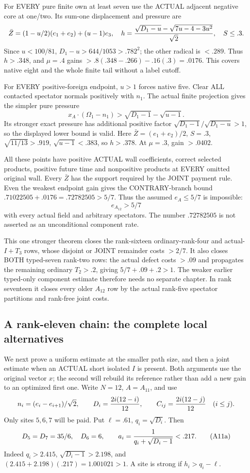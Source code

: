 For EVERY pure finite own at least seven use
the ACTUAL adjacent negative core at one/two.
Its sum-one displacement and pressure are
\[
 \bar Z=(1-u/2)(e_1+e_2)+(u-1)e_3,\quad
 h={\sqrt{D_1-u}-\sqrt{7u-4-3u^2}\over\sqrt2},
 \quad S\le.3 .
\]
Since \(u<100/81\),
\(D_1-u>644/1053>.782^2\);
the other radical is \(<.289\).
Thus \(h>.348\), and \(\mu=.4\) gains
\(>.8(.348-.266)-.16(.3)=.0176\).
This covers native eight and the whole finite
tail without a label cutoff.

For EVERY positive-foreign endpoint, \(u>1\)
forces native five.
Clear ALL contacted spectator normals positively
with \(n_1\).
The actual finite projection gives the simpler
pure pressure
\[
 x_A\cdot(\Omega_1-n_1)>
                  \sqrt{D_1-1}-\sqrt{u-1}.
\]
Its stronger exact pressure has additional
positive factor
\(\sqrt{D_1-1}/\sqrt{D_1-u}>1\), so the
displayed lower bound is valid.
Here \(\bar Z=(e_1+e_2)/2\), \(S=.3\),
\(\sqrt{11/13}>.919\), \(\sqrt{u-1}<.383\),
so \(h>.378\).
At \(\mu=.3\), gain \(>.0402\).

All these points have positive ACTUAL wall
coefficients, correct selected products, positive
future time and nonpositive products at EVERY
omitted original wall.
Every \(\bar Z\) has the support required
by the JOINT payment rule.
Even the weakest endpoint gain gives the
CONTRARY-branch bound
\(.71022505+.0176=.72782505>5/7\).
Thus the assumed \(e_A\le5/7\) is impossible:
\[
                                  e_{A_{12}}>5/7
\tag{A12U}\label{eq:arithA12universal}
\]
with every actual field and arbitrary spectators.
The number \(.72782505\) is not asserted
as an unconditional component rate.

This one stronger theorem closes the rank-sixteen
ordinary-rank-four and actual-\(I+T_3\) rows,
whose disjoint or JOINT remainder costs \(>2/7\).
It also closes BOTH typed-seven rank-two rows:
the actual defect costs \(>.09\) and propagates
the remaining ordinary \(T_2>.2\), giving
\(5/7+.09+.2>1\).
The weaker earlier typed-only component estimate
therefore needs no separate chapter.
In rank seventeen it closes every older
\(A_{12}\) row by the actual rank-five spectator
partitions and rank-free joint costs.

\subsection{A rank-eleven chain: the complete local alternatives}
\label{app:arithA11local}

We next prove a uniform estimate at the smaller
path size, and then a joint estimate when an
ACTUAL short isolated \(I\) is present.
Both arguments use the original vector \(x\);
the second will rebuild its reference rather
than add a new gain to an optimized first one.
Write \(N=12\), \(A=A_{11}\), and use
\[
 n_i=(e_i-e_{i+1})/\sqrt2,\qquad
 D_i={2i(12-i)\over12},\qquad
 C_{ij}={2i(12-j)\over12}\quad(i\le j).
\]
Only sites \(5,6,7\) will be paid.
Put \(\ell=.61\), \(q_i=\sqrt{D_i}\).
Then
\[
 D_5=D_7=35/6,\quad D_6=6,\qquad
 a_i={1\over q_i+\sqrt{D_i-1}}<.217.
\tag{A11a}\label{eq:arithA11a}
\]
Indeed \(q_i>2.415\),
\(\sqrt{D_i-1}>2.198\), and
\((2.415+2.198)(.217)=1.001021>1\).
A site is strong if \(h_i>q_i-\ell\).

